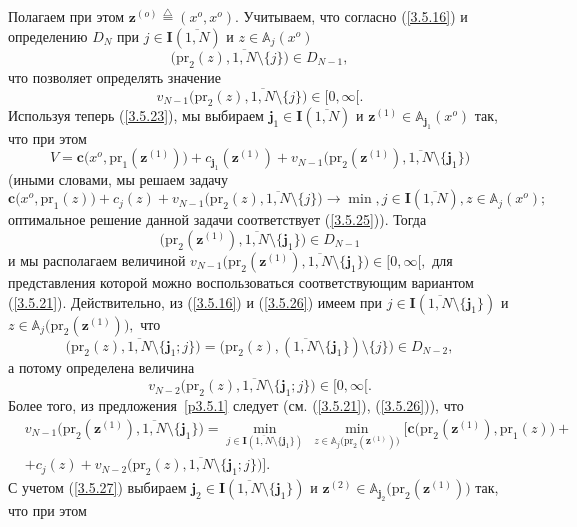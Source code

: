 \documentclass[11pt,twoside,openany]{report}
\newcommand{\bfn}{\begin{equation}}
\newcommand{\efn}{\end{equation}}
\newcommand{\df}{\stackrel{\triangle}{=}}
\newcommand{\ov}{\overline}
\newcommand{\sm}{\setminus}
\newcommand{\bba}{{\mathbb A}}
\begin{document}
{Полагаем при этом $\mathbf{z}^{(o)} \df (x^o,x^o).$ Учитываем, что согласно (\ref{3.5.16})
и определению $D_N$ при $j\in \mathbf{I}(\ov{1,N})$ и $z\in \bba_j(x^o)$
$$
\bigl(\mathrm{pr}_2(z),\ov{1,N}\sm \{j\}\bigl) \in D_{N-1},
$$
что позволяет определять значение
$$
v_{N-1}\bigl(\mathrm{pr}_2(z),\ov{1,N}\sm \{j\}\bigl)\in [0,\infty[.
$$
Используя теперь (\ref{3.5.23}), мы выбираем $\mathbf{j}_1\in
\mathbf{I}(\ov{1,N})$ и $\mathbf{z}^{(1)}\in \bba_{\mathbf{j}_1}(x^o)$  так, что при этом
\bfn\label{3.5.25}
V = \mathbf{c}\bigl(x^o,\mathrm{pr}_1(\mathbf{z}^{(1)})\bigl) +
c_{\mathbf{j}_1}(\mathbf{z}^{(1)}) + v_{N-1}\bigl(\mathrm{pr}_2(\mathbf{z}^{(1)}),
\ov{1,N}\sm \{\mathbf{j}_1\}\bigl)
\efn
(иными словами, мы решаем задачу
$$
\mathbf{c}\bigl(x^o,\mathrm{pr}_1(z)\bigl) + c_j(z) + v_{N-1}\bigl(\mathrm{pr}_2(z),
\ov{1,N}\sm\{j\}\bigl) \longrightarrow \min, j\in \mathbf{I}(\ov{1,N}), z\in \bba_j(x^o);
$$
оптимальное решение данной задачи соответствует (\ref{3.5.25})). Тогда
\bfn\label{3.5.26}
\bigl(\mathrm{pr}_2(\mathbf{z}^{(1)}),\ov{1,N}\sm \{\mathbf{j}_1\}\bigl) \in D_{N-1}
\efn
и мы располагаем величиной $v_{N-1}\bigl(\mathrm{pr}_2(\mathbf{z}^{(1)}),\ov{1,N}\sm
\{\mathbf{j}_1\}\bigl) \in [0,\infty[,$ для представления которой можно воспользоваться
соответствующим вариантом (\ref{3.5.21}). Действительно, из (\ref{3.5.16}) и (\ref{3.5.26})
имеем при $j\in \mathbf{I}(\ov{1,N}\sm \{\mathbf{j}_1\})$ и $z\in \bba_j\bigl(\mathrm{pr}_2
(\mathbf{z}^{(1)})\bigl),$ что \bfn\label{3.5.26`}\bigl(\mathrm{pr}_2(z),\ov{1,N}\sm
\{\mathbf{j}_1;j\}\bigl) = \bigl(\mathrm{pr}_2(z),(\ov{1,N}\sm\{\mathbf{j}_1\})\sm\{j\}
\bigl)\in D_{N-2},
\efn
а потому определена величина
$$
v_{N-2}\bigl(\mathrm{pr}_2(z),\ov{1,N}\sm\{\mathbf{j}_1;j\}\bigl)\in [0,\infty[.
$$
Более того, из предложения~\ref{p3.5.1} следует (см. (\ref{3.5.21}), (\ref{3.5.26})), что
\begin{eqnarray}
&v_{N-1}\bigl(\mathrm{pr}_2(\mathbf{z}^{(1)}),\ov{1,N}\sm\{\mathbf{j}_1\}\bigl) =
\min\limits_{j\in \mathbf{I}(\ov{1,N}\sm\{\mathbf{j}_1\})}\ \min\limits_{z\in
\bba_j\bigl(\mathrm{pr}_2(\mathbf{z}^{(1)})\bigl)}\bigl[\mathbf{c}
\bigl(\mathrm{pr}_2(\mathbf{z}^{(1)}),
\mathrm{pr}_1(z)\bigl) +
&\nonumber\\
&+ c_j(z) + v_{N-2}\bigl(\mathrm{pr}_2(z),\ov{1,N}\sm\{\mathbf{j}_1;j\}\bigl)\bigl].
&\label{3.5.27}
\end{eqnarray}
С учетом (\ref{3.5.27})  выбираем $\mathbf{j}_2\in \mathbf{I}(\ov{1,N}\sm\{\mathbf{j}_1\})$
и $\mathbf{z}^{(2)}\in \bba_{\mathbf{j}_2}\bigl(\mathrm{pr}_2(\mathbf{z}^{(1)})\bigl)$
так, что при этом
}
\end{document}
